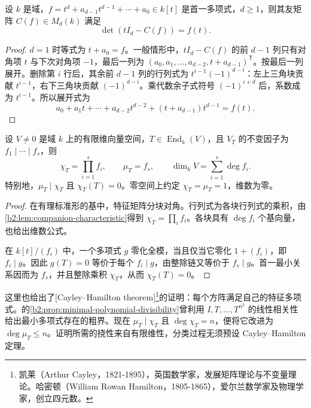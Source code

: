 \begin{lemma}\label{b2:lem:companion-characteristic}
	设 \(k\) 是域，\(f=t^d+a_{d-1}t^{d-1}+\cdots+a_0\in k[t]\) 是首一多项式，\(d\ge1\)，则其友矩阵 \(C(f)\in M_d(k)\) 满足
	\[
		\det(tI_d-C(f))=f(t).
	\]
\end{lemma}
\begin{proof}
	\(d=1\) 时等式为 \(t+a_0=f\)。一般情形中，\(tI_d-C(f)\) 的前 \(d-1\) 列只有对角项 \(t\) 与下次对角项 \(-1\)，最后一列为 \((a_0,a_1,\ldots,a_{d-2},t+a_{d-1})^{\mathsf T}\)。按最后一列展开。删除第 \(i\) 行后，其余前 \(d-1\) 列的行列式为 \(t^{i-1}(-1)^{d-i}\)：左上三角块贡献 \(t^{i-1}\)，右下三角块贡献 \((-1)^{d-i}\)。乘代数余子式符号 \((-1)^{i+d}\) 后，系数成为 \(t^{i-1}\)。所以展开式为
	\[
		a_0+a_1t+\cdots+a_{d-2}t^{d-2}+(t+a_{d-1})t^{d-1}=f(t).
	\]
\end{proof}

\begin{proposition}\label{b2:prop:operator-characteristic-minimal}
	设 \(V\ne0\) 是域 \(k\) 上的有限维向量空间，\(T\in\operatorname{End}_k(V)\)，且 \(V_T\) 的不变因子为 \(f_1\mid\cdots\mid f_s\)，则
	\[
		\chi_T=\prod_{i=1}^s f_i,\qquad \mu_T=f_s, \qquad \dim_kV=\sum_{i=1}^s\deg f_i.
	\]
	特别地，\(\mu_T\mid\chi_T\) 且 \(\chi_T(T)=0\)。零空间上约定 \(\chi_T=\mu_T=1\)，维数为零。
\end{proposition}
\begin{proof}
	在有理标准形的基中，特征矩阵分块对角。行列式为各块行列式的乘积，由\cref{b2:lem:companion-characteristic}得到 \(\chi_T=\prod_i f_i\)。各块具有 \(\deg f_i\) 个基向量，也给出维数公式。

	在 \(k[t]/(f_i)\) 中，一个多项式 \(g\) 零化全模，当且仅当它零化 \(1+(f_i)\)，即 \(f_i\mid g\)。因此 \(g(T)=0\) 等价于每个 \(f_i\mid g\)，由整除链又等价于 \(f_s\mid g\)。首一最小关系因而为 \(f_s\)，并且整除乘积 \(\chi_T\)，从而 \(\chi_T(T)=0\)。
\end{proof}

这里也给出了[Cayley--Hamilton theorem]\footnote{凯莱（Arthur Cayley，1821-1895），英国数学家，发展矩阵理论与不变量理论。哈密顿（William Rowan Hamilton，1805-1865），爱尔兰数学家及物理学家，创立四元数。}的证明：每个方阵满足自己的特征多项式。的\cref{b2:prop:minimal-polynomial-divisibility}曾利用 \(I,T,\ldots,T^{n^2}\) 的线性相关性给出最小多项式存在的粗界。现在 \(\mu_T\mid\chi_T\) 且 \(\deg\chi_T=n\)，便将它改进为 \(\deg \mu_T\le n\)。证明所需的挠性来自有限维性，分类过程无须预设 Cayley--Hamilton 定理。

